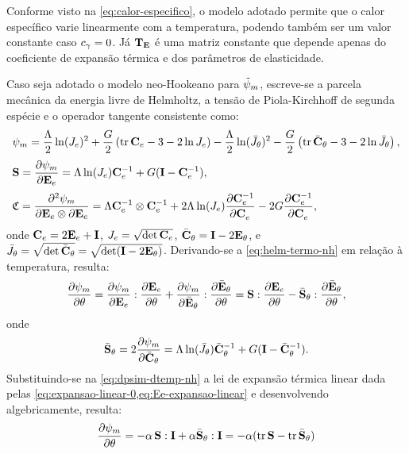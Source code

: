 \documentclass[Tese.tex]{subfiles}
\begin{document}
Conforme visto na \cref{eq:calor-especifico}, o modelo adotado permite que o calor específico varie linearmente com a temperatura, podendo também ser um valor constante caso $c_{\gamma} = 0$. Já $\mathbf{T}_{\mathbf{E}}$ é uma matriz constante que depende apenas do coeficiente de expansão térmica e dos parâmetros de elasticidade.


Caso seja adotado o modelo neo-Hookeano para $\tilde{\psi}_m$, escreve-se a parcela mecânica da energia livre de Helmholtz, a tensão de Piola-Kirchhoff de segunda espécie e o operador tangente consistente como:
\begin{align}
&\psi_m = \dfrac{\Lambda}{2}\ln(J_e)^2 + \dfrac{G}{2}\left(\text{tr}\,\mathbf{C}_e - 3 - 2\ln J_e\right) - \dfrac{\Lambda}{2}\ln(\bar{J}_{\theta})^2 - \dfrac{G}{2}\left(\text{tr}\,\bar{\mathbf{C}}_{\theta} - 3 - 2\ln\bar{J}_{\theta}\right),\label{eq:helm-termo-nh}\\[0.1cm]
&\mathbf{S}=\dfrac{\partial\psi_m}{\partial\mathbf{E}_e} = \Lambda\ln(J_e)\mathbf{C}_e^{-1} + G(\mathbf{I}-\mathbf{C}_e^{-1}), \\[0.1cm]
&\mathfrak{C}=\dfrac{\partial^2\psi_m}{\partial\mathbf{E}_e\otimes\partial\mathbf{E}_e}=\Lambda\mathbf{C}_e^{-1}\otimes\mathbf{C}_e^{-1}+2\Lambda\ln(J_e)\dfrac{\partial\mathbf{C}_e^{-1}}{\partial\mathbf{C}_e^{\;\;}} - 2G\dfrac{\partial\mathbf{C}_e^{-1}}{\partial\mathbf{C}_e^{\;\;}},
\end{align}
onde $\mathbf{C}_e = 2\mathbf{E}_e+\mathbf{I}$, $J_e = \sqrt{\det\mathbf{C}_e}$, $\bar{\mathbf{C}}_{\theta} = \mathbf{I}-2\mathbf{E}_{\theta}$, e $\bar{J}_{\theta} = \sqrt{\det\bar{\mathbf{C}}_{\theta}} = \sqrt{\det(\mathbf{I}-2\mathbf{E}_{\theta})}$. Derivando-se a \cref{eq:helm-termo-nh} em relação à temperatura, resulta:
\begin{equation}\label{eq:dpsim-dtemp-nh}
\dfrac{\partial \psi_m}{\partial \theta} = \dfrac{\partial \psi_m}{\partial \mathbf{E}_e}:\dfrac{\partial \mathbf{E}_e}{\partial\theta} + \dfrac{\partial \psi_m}{\partial \bar{\mathbf{E}}_{\theta}}:\dfrac{\partial \bar{\mathbf{E}}_{\theta}}{\partial\theta} = \mathbf{S}:\dfrac{\partial \mathbf{E}_e}{\partial\theta} - \bar{\mathbf{S}}_{\theta}:\dfrac{\partial \bar{\mathbf{E}}_{\theta}}{\partial\theta},
\end{equation}
onde
\begin{equation}
\bar{\mathbf{S}}_{\theta}=2\dfrac{\partial\psi_m}{\partial\bar{\mathbf{C}}_{\theta}} = \Lambda\ln(\bar{J}_{\theta})\bar{\mathbf{C}}_{\theta}^{-1} + G(\mathbf{I}-\bar{\mathbf{C}}_{\theta}^{-1}).
\end{equation}
Substituindo-se na \cref{eq:dpsim-dtemp-nh} a lei de expansão térmica linear dada pelas \cref{eq:expansao-linear-0,eq:Ee-expansao-linear} e desenvolvendo algebricamente, resulta:
\begin{equation}
\dfrac{\partial \psi_m}{\partial \theta} = -\alpha\,\mathbf{S}:\mathbf{I} + \alpha\bar{\mathbf{S}}_{\theta}:\mathbf{I} = -\alpha(\text{tr}\,\mathbf{S}-\text{tr}\,\bar{\mathbf{S}}_{\theta})
\end{equation}
\end{document}
